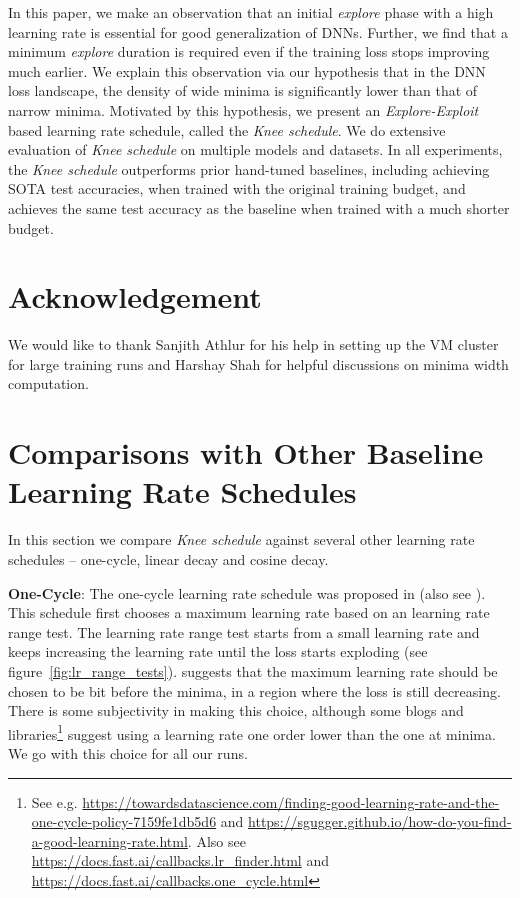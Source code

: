 \documentclass[twoside,11pt]{article}
\newcommand{\lrschedule}{\textit{Knee schedule}}
\begin{document}
In this paper, we make an observation that an initial \textit{explore} phase with a high learning rate is essential for good generalization of DNNs. Further, we find that a minimum \textit{explore} duration is required even if the training loss stops improving much earlier. We explain this observation via our hypothesis that in the DNN loss landscape, the density of wide minima is significantly lower than that of narrow minima. 
Motivated by this hypothesis, we present an \textit{Explore-Exploit} based learning rate schedule, called the \lrschedule{}. We do extensive evaluation of \lrschedule{} on multiple models and datasets. In all experiments, the \lrschedule{} outperforms prior hand-tuned baselines, including achieving SOTA test accuracies, when trained with the original training budget, and achieves the same test accuracy as the baseline when trained with a much shorter budget.

%
 \section{Acknowledgement}
\label{sec:acknowledgement}

We would like to thank Sanjith Athlur for his help in setting up the VM cluster for large training runs and Harshay Shah for helpful discussions on minima width computation.
 

\clearpage

\appendix

\clearpage
\section{Comparisons with Other Baseline Learning Rate Schedules}
\label{sec:extra_baselines}

In this section we compare \lrschedule{} against several other learning rate schedules -- one-cycle, linear decay and cosine decay.

\textbf{One-Cycle}: The one-cycle learning rate schedule was proposed in \cite{smith2018disciplined_onecycle} (also see \cite{smith2017cyclical}). This schedule first chooses a maximum learning rate based on an learning rate range test. The learning rate range test starts from a small learning rate and keeps increasing the learning rate until the loss starts exploding (see figure~\ref{fig:lr_range_tests}). \cite{smith2018disciplined_onecycle} suggests that the maximum learning rate should be chosen to be bit before the minima, in a region where the loss is still decreasing. There is some subjectivity in making this choice, although some blogs and libraries\footnote{See e.g. \url{https://towardsdatascience.com/finding-good-learning-rate-and-the-one-cycle-policy-7159fe1db5d6} and \url{https://sgugger.github.io/how-do-you-find-a-good-learning-rate.html}. Also see \url{https://docs.fast.ai/callbacks.lr_finder.html} and \url{https://docs.fast.ai/callbacks.one_cycle.html}} suggest using a learning rate one order lower than the one at minima. We go with this choice for all our runs.
\end{document}
